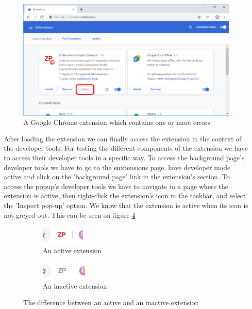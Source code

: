 \documentclass[12pt,a4paper,twoside]{report}
\begin{document}
\begin{figure}[ht]
  \centering
  \includegraphics[width=\linewidth]{img/extension_error.png}
  \caption[]{A Google Chrome extension which contains one or more errors}
  \label{fig:extension_error}
\end{figure}

After loading the extension we can finally access the extension in the context of the developer tools. For testing the different components of the extension we have to access their developer tools in a specific way. To access the background page's developer tools we have to go to the enxtensions page, have developer mode active and click on the 'background page' link in the extension's section. To access the popup's developer tools we have to navigate to a page where the extension is active, then right-click the extension's icon in the taskbar, and select the 'Inspect pop-up' option. We know that the extension is active when its icon is not greyed-out. This can be seen on figure \ref{mfig:active_and_inactive_extension}

\begin{figure}[ht]
  \centering
  \begin{subfigure}{0.4\textwidth}
    \centering
    \includegraphics[width=0.5\linewidth]{img/active_extension_icon.png}
    \caption[]{An active extension}
    \label{fig:active_extension}
  \end{subfigure}
  \begin{subfigure}{0.4\textwidth}
    \centering
    \includegraphics[width=0.5\linewidth]{img/inactive_extension_icon.png}
    \caption[]{An inactive extension}
    \label{fig:inactive_extension}
  \end{subfigure}
  \caption{The difference between an active and an inactive extension}
  \label{mfig:active_and_inactive_extension}
\end{figure}
\end{document}
